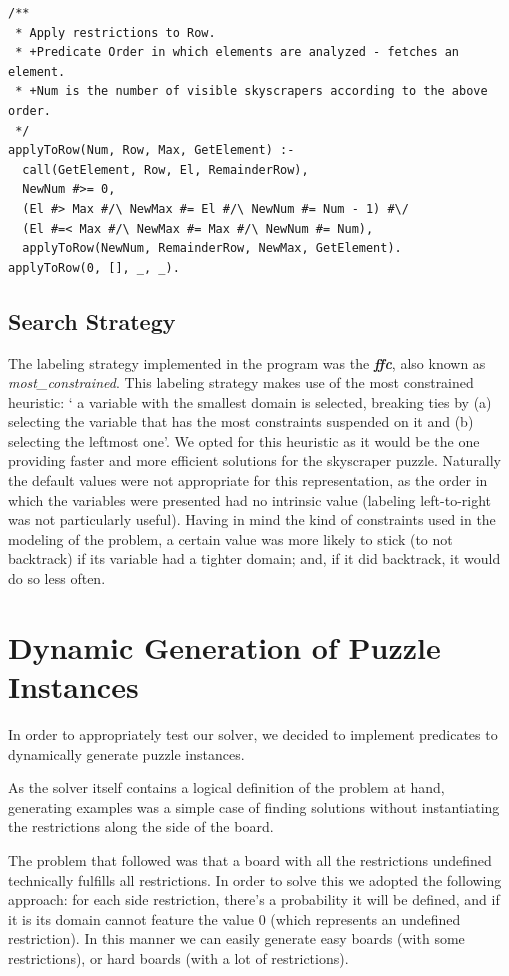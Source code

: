 \documentclass{llncs}
\begin{document}
\begin{lstlisting}[frame=tblr, caption=Constraint that assures correct number of visible buildings ]	
/**
 * Apply restrictions to Row.
 * +Predicate Order in which elements are analyzed - fetches an element.
 * +Num is the number of visible skyscrapers according to the above order.
 */
applyToRow(Num, Row, Max, GetElement) :-
  call(GetElement, Row, El, RemainderRow),
  NewNum #>= 0,
  (El #> Max #/\ NewMax #= El #/\ NewNum #= Num - 1) #\/
  (El #=< Max #/\ NewMax #= Max #/\ NewNum #= Num),
  applyToRow(NewNum, RemainderRow, NewMax, GetElement).
applyToRow(0, [], _, _).
\end{lstlisting}

%
\subsection{Search Strategy}

The labeling strategy implemented in the program was the \textbf{\textit{ffc}}, also known as \textit{most\_constrained}. This labeling strategy makes use of the most constrained heuristic: ` a variable with the smallest domain is selected, breaking ties by (a) selecting the variable that has the most constraints suspended on it and (b) selecting the leftmost one'\cite{carlsson_fruhwirth_2016}.  We opted for this heuristic as it would be the one providing faster and more efficient solutions for the skyscraper puzzle. Naturally the default values were not appropriate for this representation, as the order in which the variables were presented had no intrinsic value (labeling left-to-right was not particularly useful). Having in mind the kind of constraints used in the modeling of the problem, a certain value was more likely to stick (to not backtrack) if its variable had a tighter domain; and, if it did backtrack, it would do so less often.

%
\section{Dynamic Generation of Puzzle Instances}

In order to appropriately test our solver, we decided to implement predicates to dynamically generate puzzle instances.

As the solver itself contains a logical definition of the problem at hand, generating examples was a simple case of finding solutions without instantiating the restrictions along the side of the board.

The problem that followed was that a board with all the restrictions undefined technically fulfills all restrictions. In order to solve this we adopted the following approach: for each side restriction, there's a probability it will be defined, and if it is its domain cannot feature the value 0 (which represents an undefined restriction). In this manner we can easily generate easy boards (with some restrictions), or hard boards (with a lot of restrictions).
\end{document}
